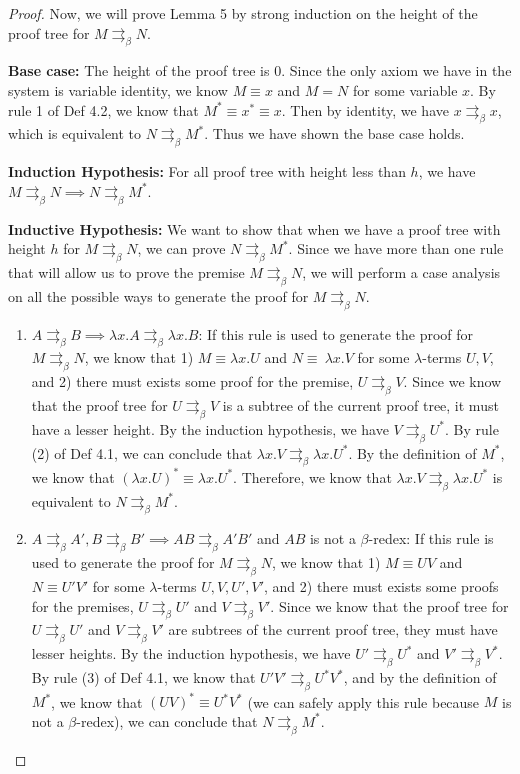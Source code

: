 \documentclass[a4paper,11pt]{article}
\theoremstyle{definition}
\theoremstyle{example}
\theoremstyle{lemma}
\newcommand{\lamterm}[2]{\lambda #1. #2}
\newcommand{\pbr}{\rightrightarrows_{\beta}}
\begin{document}
\begin{proof}
Now, we will prove Lemma 5 by strong induction on the height of the proof tree for $M \pbr N$.

\textbf{Base case: }The height of the proof tree is $0$. Since the only axiom we have in the system is variable identity, we know $M \equiv x$ and $M = N$ for some variable $x$. By rule 1 of Def 4.2, we know that $M^* \equiv x^* \equiv x$. Then by identity, we have $x \pbr x$, which is equivalent to $N \pbr M^*$. Thus we have shown the base case holds.

\textbf{Induction Hypothesis: }For all proof tree with height less than $h$, we have $M \pbr N \implies N \pbr M^*$.

\textbf{Inductive Hypothesis: }We want to show that when we have a proof tree with height $h$ for $M \pbr N$, we can prove $N \pbr M^*$. Since we have more than one rule that will allow us to prove the premise $M \pbr N$, we will perform a case analysis on all the possible ways to generate the proof for $M \pbr N$.
\begin{enumerate}[topsep=2pt,itemsep=-0.5ex,partopsep=1ex,parsep=1ex]
    \item $A \pbr B \implies \lamterm{x}{A} \pbr \lamterm{x}{B}$: If this rule is used to generate the proof for $M \pbr N$, we know that 1) $M \equiv \lamterm{x}{U}$ and $N \equiv \
    \lamterm{x}{V}$ for some $\lambda$-terms $U,V$, and 2) there must exists some proof for the premise, $U \pbr V$. Since we know that the proof tree for $U \pbr V$ is a subtree of the current proof tree, it must have a lesser height. By the induction hypothesis, we have $V \pbr U^*$. By rule (2) of Def 4.1, we can conclude that $\lamterm{x}{V} \pbr \lamterm{x}{U^*}$. By the definition of $M^*$, we know that $(\lamterm{x}{U})^* \equiv \lamterm{x}{U^*}$. Therefore, we know that $\lamterm{x}{V} \pbr \lamterm{x}{U^*}$ is equivalent to $N \pbr M^*$.
    \item $A \pbr A', B \pbr B' \implies AB \pbr A'B'$ and $AB$ is not a $\beta$-redex: If this rule is used to generate the proof for $M \pbr N$, we know that 1) $M \equiv UV$ and $N \equiv U'V'$ for some $\lambda$-terms $U, V, U', V'$, and 2) there must exists some proofs for the premises, $U \pbr U'$ and $V \pbr V'$. Since we know that the proof tree for $U \pbr U'$ and $V \pbr V'$ are subtrees of the current proof tree, they must have lesser heights. By the induction hypothesis, we have $U' \pbr U^*$ and $V' \pbr V^*$. By rule (3) of Def 4.1, we know that $U'V' \pbr U^*V^*$, and by the definition of $M^*$, we know that $(UV)^* \equiv U^*V^*$ (we can safely apply this rule because $M$ is not a $\beta$-redex), we can conclude that $N \pbr M^*$.

\end{enumerate}
\end{proof}
\end{document}
